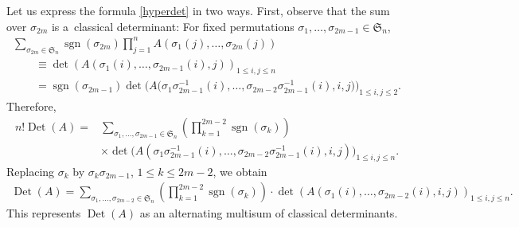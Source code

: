 \documentclass[10pt,a4paper]{amsart}
\numberwithin{equation}{section}
\def\sgn{\operatorname{sgn}}
\def\Det{\operatorname{Det}}
\def\frS{\mathfrak{S}}
\begin{document}
{\allowdisplaybreaks Let us express the formula \eqref{hyperdet} in two ways. First, observe that the sum over $\sigma_{2m}$ is a~classical determinant: For fixed permutations $\sigma_1,\dots,\sigma_{2m-1} \in \frS_n$,
\begin{gather*}
\sum_{\sigma_{2m} \in \frS_n} \sgn(\sigma_{2m}) \prod_{j=1}^n A(\sigma_1(j),\dots,\sigma_{2m}(j)) \\
\qquad\equiv \det(A(\sigma_1(i),\dots,\sigma_{2m-1}(i),j))_{1 \le i,j \le n} \\
\qquad= \sgn(\sigma_{2m-1}) \det\bigl(A\bigl(\sigma_1\sigma_{2m-1}^{-1}(i),\dots,\sigma_{2m-2}\sigma_{2m-1}^{-1}(i),i,j\bigr)\bigr)_{1 \le i,j \le 2}.
\end{gather*}
Therefore,
\begin{align*}
n! \Det(A) ={}& \sum_{\sigma_1,\dots,\sigma_{2m-1} \in \frS_n}
\left(\prod_{k=1}^{2m-2} \sgn(\sigma_k)\right)\\
&
\times \det\bigl(A(\sigma_1\sigma_{2m-1}^{-1}(i),\dots,\sigma_{2m-2}\sigma_{2m-1}^{-1}(i),i,j)\bigr)_{1 \le i,j \le n} .
\end{align*}
Replacing $\sigma_k$ by $\sigma_k \sigma_{2m-1}$, $1 \le k \le 2m-2$, we obtain
\begin{gather}
\Det(A)
= \sum_{\sigma_1,\dots,\sigma_{2m-2} \in \frS_n} \left(\prod_{k=1}^{2m-2} \sgn(\sigma_k)\right) \cdot \det(A(\sigma_1(i),\dots,\sigma_{2m-2}(i),i,j))_{1 \le i,j \le n}.\label{recurrencetwobytwo}
\end{gather}
This represents $\Det(A)$ as an alternating multisum of classical determinants.

}
\end{document}
